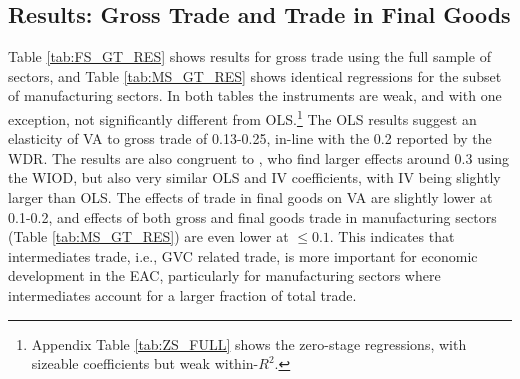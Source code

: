 \documentclass[a4paper]{article}
\begin{document}
\subsection{Results: Gross Trade and Trade in Final Goods}

 Table \ref{tab:FS_GT_RES} shows results for gross trade using the full sample of sectors, and Table \ref{tab:MS_GT_RES} shows identical regressions for the subset of manufacturing sectors. In both tables the instruments are weak, and with one exception, not significantly different from OLS.\footnote{Appendix Table \ref{tab:ZS_FULL} shows the zero-stage regressions, with sizeable coefficients but weak within-$R^2$. } The OLS results suggest an elasticity of VA to gross trade of 0.13-0.25, in-line with the 0.2 reported by the WDR. The results are also congruent to \citet{altomonte2018trade}, who find larger effects around 0.3 using the WIOD, but also very similar OLS and IV coefficients, with IV being slightly larger than OLS. The effects of trade in final goods on VA are slightly lower at 0.1-0.2, and effects of both gross and final goods trade in manufacturing sectors (Table \ref{tab:MS_GT_RES}) are even lower at $\leq 0.1$. This indicates that intermediates trade, i.e., GVC related trade, is more important for economic development in the EAC, particularly for manufacturing sectors where intermediates account for a larger fraction of total trade. 
\end{document}
